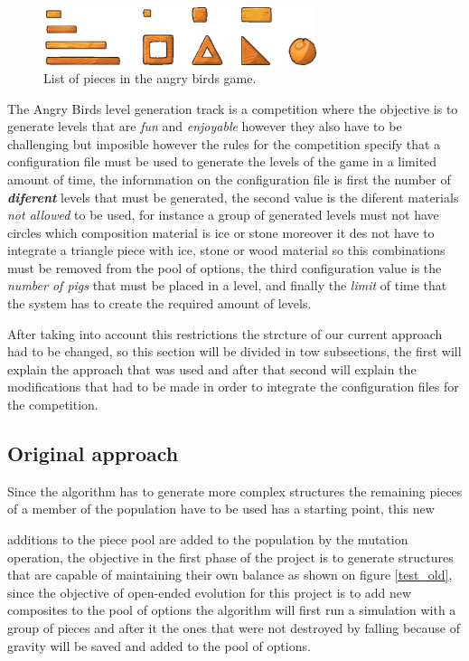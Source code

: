 \documentclass[conference]{IEEEtran}
\begin{document}
\begin{figure}[htbp]
\centerline{\includegraphics[width=80mm]{Images/list_pieces.png}}
\caption{List of pieces in the angry birds game.}
\label{piece_list}
\end{figure}


The Angry Birds level generation track is a competition where the objective is 
to generate levels that are \textit{fun} and \textit{enjoyable} however they 
also have to be challenging but imposible however the rules for the competition 
specify that a configuration file must be used to
generate the levels of the game in a limited amount of time, the infornmation on
the configuration file is first the number of \textbf{\textit{diferent}} levels
that must be generated, the second value is the diferent materials \textit{not
allowed} to be used, for instance a group of generated levels must not have
circles which composition material is ice or stone moreover it des not have to
integrate a triangle piece with ice, stone or wood material so this combinations
must be removed from the pool of options, the third configuration value is the
\textit{number of pigs} that must be placed in a level, and finally the
\textit{limit} of time that the system has to create the required amount of
levels.

After taking into account this restrictions the strcture of our current approach
had to be changed, so this section will be divided in tow subsections, the first
will explain the approach that was used and after that second will explain the
modifications that had to be made in order to integrate the configuration files
for the competition. 

\subsection{Original approach}
Since the algorithm has to generate more complex structures the remaining pieces
of a member of the population have to be used has a starting point, this new

additions to the piece pool are added to the population by the mutation
operation, the objective in the first phase of the project is to generate
structures that are capable of maintaining their own balance as shown on figure
\ref{test_old}, since the objective of open-ended evolution for this project is
to add new composites to the pool of options the algorithm will first run a
simulation with a group of pieces and after it the ones that were not destroyed
by falling because of gravity will be saved and added to the pool of options.
\end{document}
